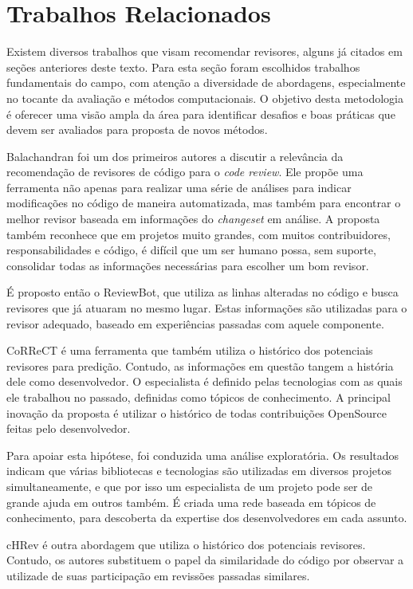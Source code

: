 \documentclass[a4paper,12pt]{monografia}
\theoremstyle{plain}
\theoremstyle{definition}
\theoremstyle{remark}
\begin{document}
\chapter{Trabalhos Relacionados}\label{cha:relacionados}

Existem diversos trabalhos que visam recomendar revisores, alguns já citados em seções anteriores deste texto. Para esta seção foram escolhidos trabalhos fundamentais do campo, com atenção a diversidade de abordagens, especialmente no tocante da avaliação e métodos computacionais. O objetivo desta metodologia é oferecer uma visão ampla da área para identificar desafios e boas práticas que devem ser avaliados para proposta de novos métodos.

Balachandran \cite{balachandran2013} foi um dos primeiros autores a discutir a relevância da recomendação de revisores de código para o \textit{code review}. Ele propõe uma ferramenta não apenas para realizar uma série de análises para indicar modificações no código de maneira automatizada, mas também para encontrar o melhor revisor baseada em informações do \textit{changeset} em análise. A proposta também reconhece que em projetos muito grandes,  com muitos contribuidores, responsabilidades e código, é difícil que um ser humano possa, sem suporte, consolidar todas as informações necessárias para escolher um bom revisor.

É proposto então o ReviewBot, que utiliza as linhas alteradas no código e busca revisores que já atuaram no mesmo lugar. Estas informações são utilizadas para o revisor adequado, baseado em experiências passadas com aquele componente.

CoRReCT \cite{rahman2016} é uma ferramenta que também utiliza o histórico dos potenciais revisores para predição. Contudo, as informações em questão tangem a história dele como desenvolvedor. O especialista é definido pelas tecnologias com as quais ele trabalhou no passado, definidas como tópicos de conhecimento. A principal inovação da proposta é utilizar o histórico de todas contribuições OpenSource feitas pelo desenvolvedor.

Para apoiar esta hipótese, foi conduzida uma análise exploratória. Os resultados indicam que várias bibliotecas e tecnologias são utilizadas em diversos projetos simultaneamente, e que por isso um especialista de um projeto pode ser de grande ajuda em outros também. É criada uma rede baseada em tópicos de conhecimento, para descoberta da expertise dos desenvolvedores em cada assunto.


cHRev \cite{zanjani2016} é outra abordagem que utiliza o histórico dos potenciais revisores. Contudo, os autores substituem o papel da similaridade do código por observar a utilizade de suas participação em revissões passadas similares.
\end{document}
